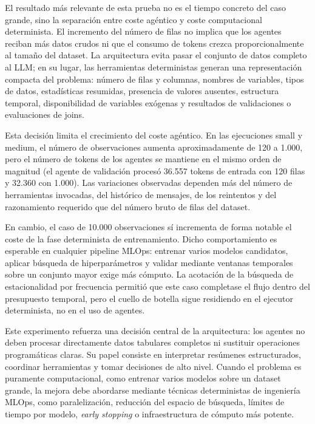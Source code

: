 \documentclass[12pt,a4paper]{article}
\theoremstyle{plain}
\begin{document}
El resultado más relevante de esta prueba no es el tiempo concreto del caso grande, sino la
separación entre coste agéntico y coste computacional determinista. El incremento del número
de filas no implica que los agentes reciban más datos crudos ni que el consumo de tokens
crezca proporcionalmente al tamaño del dataset. La arquitectura evita pasar el conjunto de datos
completo al LLM; en su lugar, las herramientas deterministas generan una representación
compacta del problema: número de filas y columnas, nombres de variables, tipos de datos,
estadísticas resumidas, presencia de valores ausentes, estructura temporal, disponibilidad de
variables exógenas y resultados de validaciones o evaluaciones de joins.

Esta decisión limita el crecimiento del coste agéntico. En las ejecuciones small y medium, el
número de observaciones aumenta aproximadamente de 120 a 1.000, pero el número de tokens de
los agentes se mantiene en el mismo orden de magnitud (el agente de validación procesó 36.557
tokens de entrada con 120 filas y 32.360 con 1.000). Las variaciones observadas
dependen más del número de herramientas invocadas, del histórico de mensajes, de los
reintentos y del razonamiento requerido que del número bruto de filas del dataset.

En cambio, el caso de 10.000 observaciones sí incrementa de forma notable el coste de la fase
determinista de entrenamiento. Dicho comportamiento es esperable en cualquier pipeline MLOps:
entrenar varios modelos candidatos, aplicar búsqueda de hiperparámetros y validar mediante
ventanas temporales sobre un conjunto mayor exige más cómputo. La acotación de la búsqueda de
estacionalidad por frecuencia permitió que este caso completase el flujo dentro del
presupuesto temporal, pero el cuello de botella sigue residiendo en el ejecutor determinista,
no en el uso de agentes.

Este experimento refuerza una decisión central de la arquitectura: los agentes no deben
procesar directamente datos tabulares completos ni sustituir operaciones programáticas claras.
Su papel consiste en interpretar resúmenes estructurados, coordinar herramientas y tomar
decisiones de alto nivel. Cuando el problema es puramente computacional, como entrenar varios
modelos sobre un dataset grande, la mejora debe abordarse mediante técnicas deterministas de
ingeniería MLOps, como paralelización, reducción del espacio de búsqueda, límites de tiempo
por modelo, \textit{early stopping} o infraestructura de cómputo más potente.
\end{document}
